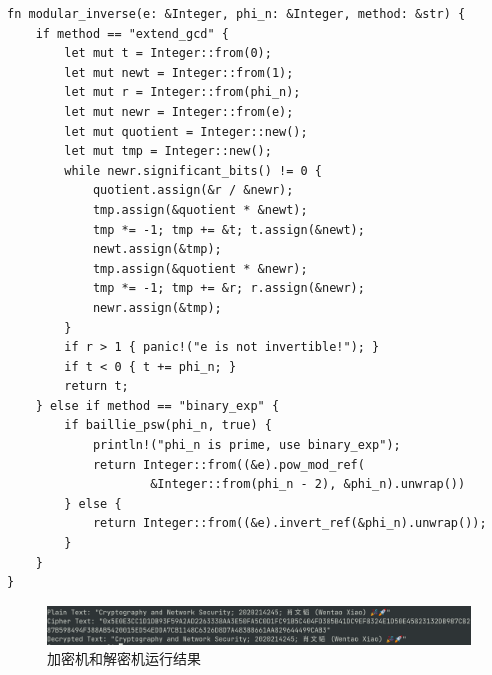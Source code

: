 \documentclass[degree=project,degree-type=project,cjk-font=noto]{thuthesis}
\begin{document}
  \begin{verbatim}
fn modular_inverse(e: &Integer, phi_n: &Integer, method: &str) {
    if method == "extend_gcd" {
        let mut t = Integer::from(0);
        let mut newt = Integer::from(1);
        let mut r = Integer::from(phi_n);
        let mut newr = Integer::from(e);
        let mut quotient = Integer::new();
        let mut tmp = Integer::new();
        while newr.significant_bits() != 0 {
            quotient.assign(&r / &newr);
            tmp.assign(&quotient * &newt);
            tmp *= -1; tmp += &t; t.assign(&newt);
            newt.assign(&tmp);
            tmp.assign(&quotient * &newr);
            tmp *= -1; tmp += &r; r.assign(&newr);
            newr.assign(&tmp);
        }
        if r > 1 { panic!("e is not invertible!"); }
        if t < 0 { t += phi_n; }
        return t;
    } else if method == "binary_exp" {
        if baillie_psw(phi_n, true) {
            println!("phi_n is prime, use binary_exp");
            return Integer::from((&e).pow_mod_ref(
                    &Integer::from(phi_n - 2), &phi_n).unwrap())
        } else {
            return Integer::from((&e).invert_ref(&phi_n).unwrap());
        }
    }
}
  \end{verbatim}


\begin{figure}[h]
\centering%
\includegraphics[width=\linewidth]{aes_t4.png}
  \caption{加密机和解密机运行结果}
  \label{fig:t4}
\end{figure}

\backmatter

\end{document}
